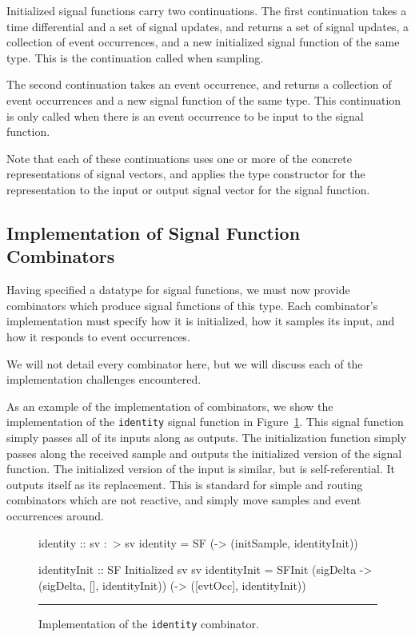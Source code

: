 Initialized signal functions carry two continuations. The first continuation
takes a time differential and a set of signal updates, and returns a set of
signal updates, a collection of event occurrences, and a new initialized signal
function of the same type. This is the continuation called when sampling.

The second continuation takes an event occurrence, and returns a collection of
event occurrences and a new signal function of the same type. This continuation
is only called when there is an event occurrence to be input to the signal
function.

Note that each of these continuations uses one or more of the concrete
representations of signal vectors, and applies the type constructor for the
representation to the input or output signal vector for the signal function.

\subsection{Implementation of Signal Function Combinators}
\label{subsection:Implementation-Signal_Functions-Implementation_of_Signal_Function_Combinators}

Having specified a datatype for signal functions, we must now provide
combinators which produce signal functions of this type. Each combinator's
implementation must specify how it is initialized, how it samples its input, and
how it responds to event occurrences.

We will not detail every combinator here, but we will discuss each of the
implementation challenges encountered.

As an example of the implementation of combinators, we show the implementation
of the {\tt identity} signal function in Figure~\ref{figure:identity_implementation}.
This signal function simply passes all of its inputs along as outputs. The
initialization function simply passes along the received sample and outputs the
initialized version of the signal function. The initialized version of the input
is similar, but is self-referential. It outputs itself as its replacement. This
is standard for simple and routing combinators which are not reactive, and
simply move samples and event occurrences around.

\begin{figure}
\begin{code}
identity :: sv :~> sv
identity =
  SF (\initSample -> (initSample, identityInit))

identityInit :: SF Initialized sv sv
identityInit =
  SFInit (\dt sigDelta -> (sigDelta, [], identityInit))
         (\evtOcc -> ([evtOcc], identityInit))
\end{code}
\hrule
\caption{Implementation of the {\tt identity} combinator.}
\label{figure:identity_implementation}
\end{figure}

